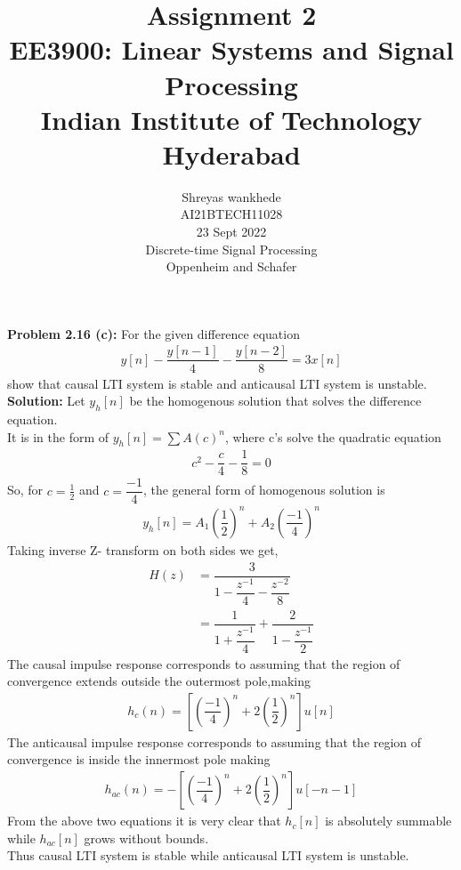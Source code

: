 \documentclass[journal,12pt,twocolumn]{IEEEtran}
\title{Assignment 2 \\ \Large EE3900: Linear Systems and Signal Processing \\ \large Indian Institute of Technology Hyderabad}
\author{Shreyas wankhede \\ \normalsize AI21BTECH11028\\ \vspace*{20pt} \normalsize 23 Sept 2022 \\ \vspace*{20pt} \Large Discrete-time Signal Processing \\ \large Oppenheim and Schafer}
\newcommand{\solution}{\noindent \textbf{Solution: }}
\begin{document}
	\maketitle
    \textbf{ Problem 2.16 (c):} For the given difference equation 
    \begin{align}
     y[n] -\dfrac{y[n-1]}{4} -\dfrac{y[n-2]}{8}=3x[n]
    \end{align}
     show that causal LTI system is stable and anticausal LTI system is unstable.\\
    \solution Let $y_{h}[n]$ be the homogenous solution that solves the difference equation.\\
    It  is in the form of $y_{h}[n]=\sum{A(c)^{n}}$, where c's solve the quadratic equation
    \begin{align}
    c^2 -\dfrac{c}{4} -\dfrac{1}{8}=0
    \end{align}
    So, for $c=\frac{1}{2}$ and $c=\dfrac{-1}{4}$, the general form of homogenous solution is
    \begin{align}
        y_{h}[n]=A_{1}(\dfrac{1}{2})^n + A_{2}(\dfrac{-1}{4})^n
    \end{align}
    Taking inverse Z- transform on both sides we get,\\
    \begin{align}
        H(z)&=\dfrac{3}{1-\dfrac{z^{-1}}{4}-\dfrac{z^{-2}}{8}}\\
        &=\dfrac{1}{1+\dfrac{z^{-1}}{4}}+\dfrac{2}{1-\dfrac{z^{-1}}{2}}
    \end{align}
    The causal impulse response corresponds to assuming that the region of convergence extends outside the outermost pole,making
    \begin{align}
        h_{c}(n)=[(\dfrac{-1}{4})^n+ 2(\dfrac{1}{2})^n]u[n]
    \end{align}
    The anticausal impulse response corresponds to assuming that the region of convergence is inside the innermost pole making
    \begin{align}
        h_{ac}(n)=-[(\dfrac{-1}{4})^n+ 2(\dfrac{1}{2})^n]u[-n-1]
    \end{align}
    From the above two equations it is very clear that $h_{c}[n]$ is absolutely summable while $h_{ac}[n]$ grows without bounds.\\
    Thus causal LTI system is stable while anticausal LTI system is unstable.
\end{document}
